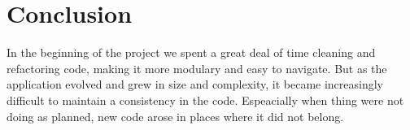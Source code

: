 \chapter{Conclusion}
\label{chap:conclusion}

In the beginning of the project we spent a great deal of time cleaning and refactoring code, making it more modulary and easy to navigate. But as the application evolved and grew in size and complexity, it became increasingly difficult to maintain a consistency in the code. Espeacially when thing were not doing as planned, new code arose in places where it did not belong.

